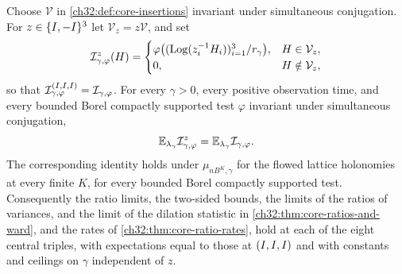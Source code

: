\begin{theorem}\label{ch32:thm:all-central-triples}
Choose $\mathcal V$ in \cref{ch32:def:core-insertions} invariant under simultaneous conjugation. For $z\in\{I,-I\}^3$ let $\mathcal V_z=z\mathcal V$, and set
\[
 \mathcal I^z_{\gamma,\varphi}(H)=
 \begin{cases}
 \varphi\bigl((\operatorname{Log}(z_i^{-1}H_i))_{i=1}^3/r_\gamma\bigr),&H\in\mathcal V_z,\\
 0,&H\notin\mathcal V_z,
 \end{cases}
\]
so that $\mathcal I^{(I,I,I)}_{\gamma,\varphi}=\mathcal I_{\gamma,\varphi}$. For every $\gamma>0$, every positive observation time, and every bounded Borel compactly supported test $\varphi$ invariant under simultaneous conjugation,
\[
 \mathbb E_{\lambda_\gamma}\mathcal I^z_{\gamma,\varphi}=\mathbb E_{\lambda_\gamma}\mathcal I_{\gamma,\varphi}.
\]
The corresponding identity holds under $\mu_{nB^K,\gamma}$ for the flowed lattice holonomies at every finite $K$, for every bounded Borel compactly supported test. Consequently the ratio limits, the two-sided bounds, the limits of the ratios of variances, and the limit of the dilation statistic in \cref{ch32:thm:core-ratios-and-ward}, and the rates of \cref{ch32:thm:core-ratio-rates}, hold at each of the eight central triples, with expectations equal to those at $(I,I,I)$ and with constants and ceilings on $\gamma$ independent of $z$.
\end{theorem}

